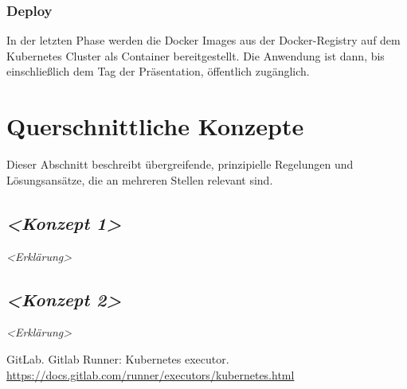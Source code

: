 \documentclass[letterpaper, 10 pt, conference]{ieeeconf}
\begin{document}
\subsubsection{Deploy}

In der letzten Phase werden die Docker Images aus der Docker-Registry auf dem Kubernetes Cluster als Container bereitgestellt. Die Anwendung ist dann,  bis einschließlich dem Tag der Präsentation, öffentlich zugänglich.


\section{Querschnittliche Konzepte}

Dieser Abschnitt beschreibt übergreifende, prinzipielle Regelungen und
Lösungsansätze, die an mehreren Stellen relevant sind.

\subsection{\texorpdfstring{\emph{\textless Konzept
1\textgreater{}}}{\textless Konzept 1\textgreater{}}}

\emph{\textless Erklärung\textgreater{}}

\subsection{\texorpdfstring{\emph{\textless Konzept
2\textgreater{}}}{\textless Konzept 2\textgreater{}}}

\emph{\textless Erklärung\textgreater{}}

\begin{thebibliography}{99}

 GitLab.  Gitlab Runner: Kubernetes executor.   \url{https://docs.gitlab.com/runner/executors/kubernetes.html}

\end{thebibliography}


\addtolength{\textheight}{-12cm}
\end{document}
